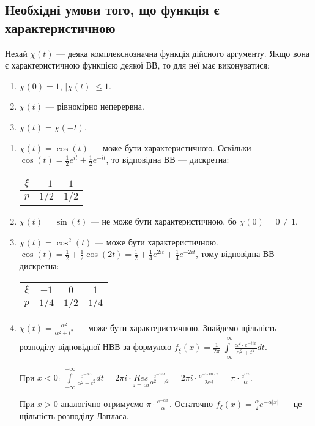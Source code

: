 \subsection{Необхідні умови того, що функція є характеристичною}
Нехай $\chi(t)$ --- деяка комплекснозначна функція дійсного аргументу.
Якщо вона є характеристичною функцією деякої ВВ, то для неї має виконуватися:
\begin{enumerate}
    \item $\chi(0) = 1$, $\left| \chi(t)\right| \leq 1$.
    \item $\chi(t)$ --- рівномірно неперервна.
    \item $\overline{\chi(t)} = \chi(-t)$.
\end{enumerate}
\begin{example}
    \begin{enumerate}
        \item $\chi(t) = \cos(t)$ --- може бути характеристичною.
        Оскільки $\cos(t) = \frac{1}{2}e^{it} + \frac{1}{2}e^{-it}$, то відповідна ВВ --- дискретна: 
        \begin{tabular}{c|c|c}
            $\xi$ & $-1$ & $1$ \\
            \hline
            $p$ & $1/2$ & $1/2$
        \end{tabular}
        \item $\chi(t) = \sin(t)$ --- не може бути характеристичною, бо $\chi(0) = 0 \neq 1$.
        \item $\chi(t) = \cos^2(t)$ --- може бути характеристичною.
        $\cos(t) = \frac{1}{2} + \frac{1}{2}\cos(2t) = \frac{1}{2} + \frac{1}{4}e^{2it} + \frac{1}{4}e^{-2it}$, тому
        відповідна ВВ --- дискретна:
        \begin{tabular}{c|c|c|c}
            $\xi$ & $-1$ & $0$ & $1$ \\
            \hline
            $p$ & $1/4$ & $1/2$ & $1/4$
        \end{tabular}
        \item $\chi(t) = \frac{\alpha^2}{\alpha^2 + t^2}$ --- може бути характеристичною. 
        Знайдемо щільність розподілу відповідної НВВ за формулою $f_\xi(x) = \frac{1}{2\pi}\int\limits_{-\infty}^{+\infty} \frac{\alpha^2 \cdot e^{-itx}}{\alpha^2 + t^2} dt$.

        При $x<0$: $\int\limits_{-\infty}^{+\infty} \frac{e^{-itx}}{\alpha^2 + t^2} dt = 2\pi i \cdot \underset{z=\alpha i}{{Res}} \frac{e^{-izx}}{\alpha^2 + z^2} = 2\pi i \cdot \frac{e^{-i\cdot \alpha i\cdot x}}{2\alpha i} = \pi \cdot \frac{e^{\alpha x}}{\alpha}$.

        При $x>0$ аналогічно отримуємо $\pi \cdot \frac{e^{-\alpha x}}{\alpha}$.
        Остаточно $f_\xi(x) = \frac{\alpha}{2}e^{-\alpha |x|}$ --- це щільність розподілу Лапласа.
    \end{enumerate}
\end{example}


